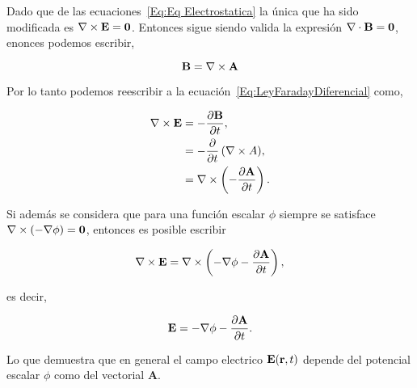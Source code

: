 \begin{obs}
	Dado que de las ecuaciones~\eqref{Eq:Eq Electrostatica} la única que ha sido modificada es $\nabla \times \textbf{E} = \textbf{0}$. Entonces sigue siendo valida la expresión $\nabla \cdot \textbf{B} = \textbf{0}$, enonces podemos escribir,

	\begin{equation*}
		\textbf{B} = \nabla \times \textbf{A}
	\end{equation*}

	Por lo tanto podemos reescribir a la ecuación~\eqref{Eq:LeyFaradayDiferencial} como,

	\begin{align*}
		\rotational{\E} &= -\diffp{\B}{t},\\
										&= -\diffp*{\left( \rotational{A} \right) }{t},\\
										&= \rotational{ \left(-\diffp{\textbf{A}}{t}\right) }.
	\end{align*}

	Si además se considera que para una función escalar $\phi$ siempre se satisface $\nabla \times  \left( -\nabla \phi \right) = \mathbf{0}$, entonces es posible escribir

	\begin{equation*}
		\rotational{\E} = \rotational{ \left( -\nabla\phi -\diffp{\textbf{A}}{t} \right)},
	\end{equation*}

	es decir,

	\begin{equation}
		\E = -\nabla\phi -\diffp{\textbf{A}}{t}.
	\end{equation}

	Lo que demuestra que en general el campo electrico $\textbf{E}(\textbf{r}, t)$ depende del potencial escalar $\phi$ como del vectorial $\textbf{A}$.
\end{obs}
%
%
%
%
